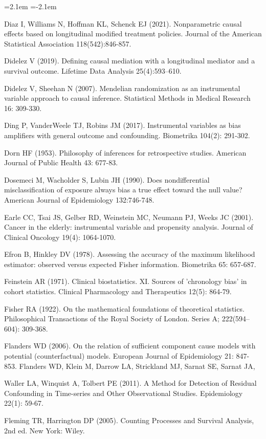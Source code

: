 \begin{list}{}{\leftmargin=2.1em   \itemindent=-2.1em \parsep=0pt \itemsep=1.6pt \topsep=4pt \rightmargin=0pt}
\item Diaz I, Williams N, Hoffman KL, Schenck EJ (2021). Nonparametric causal effects based on longitudinal modified treatment policies. Journal of the American Statistical Association 118(542):846-857.
\item Didelez V (2019). Defining causal mediation with a longitudinal mediator and a survival outcome. Lifetime Data Analysis 25(4):593–610.
\item Didelez V, Sheehan N (2007). Mendelian randomization as an instrumental variable approach to causal inference. Statistical Methods in Medical Research 16: 309-330.
\item Ding P, VanderWeele TJ, Robins JM (2017). Instrumental variables as bias amplifiers with general outcome and confounding. Biometrika 104(2): 291-302.
\item Dorn HF (1953). Philosophy of inferences for retrospective studies. American Journal of Public Health 43: 677-83.
\item Dosemeci M, Wacholder S, Lubin JH (1990). Does nondifferential misclassification of exposure always bias a true effect toward the null value? American Journal of Epidemiology 132:746-748.
\item Earle CC, Tsai JS, Gelber RD, Weinstein MC, Neumann PJ, Weeks JC (2001). Cancer in the elderly: instrumental variable and propensity analysis. Journal of Clinical Oncology 19(4): 1064-1070.
\item Efron B, Hinkley DV (1978). Assessing the accuracy of the maximum likelihood estimator: observed versus expected Fisher information. Biometrika 65: 657-687.
\item Feinstein AR (1971). Clinical biostatistics. XI. Sources of 'chronology bias' in cohort statistics. Clinical Pharmacology and Therapeutics 12(5): 864-79.
\item Fisher RA (1922). On the mathematical foundations of theoretical statistics. Philosophical Transactions of the Royal Society of London. Series A; 222(594–604): 309-368.
\item Flanders WD (2006). On the relation of sufficient component cause models with potential (counterfactual) models. European Journal of Epidemiology 21: 847-853. Flanders WD, Klein M, Darrow LA, Strickland MJ, Sarnat SE, Sarnat JA,
\item Waller LA, Winquist A, Tolbert PE (2011). A Method for Detection of Residual Confounding in Time-series and Other Observational Studies. Epidemiology 22(1): 59-67.
\item Fleming TR, Harrington DP (2005). Counting Processes and Survival Analysis, 2nd ed. New York: Wiley.

\end{list}
